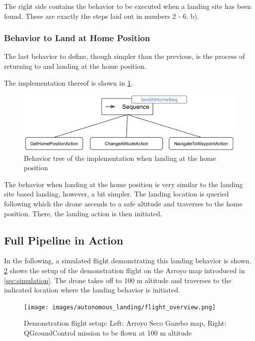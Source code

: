 The right side contains the behavior to be executed when a landing site has been found. These are exactly the steps laid out in numbers 2 - 6. b).


\subsubsection{Behavior to Land at Home Position}

The last behavior to define, though simpler than the previous, is the process of returning to and landing at the home position. 

The implementation thereof is shown in \cref{fig:bt_land_at_home}.

\begin{figure}[h]
\centering
\includegraphics[scale=0.2]{images/autonomous_landing/land_at_home_beh.png}
\caption{Behavior tree of the implementation when landing at the home position}
\label{fig:bt_land_at_home}
\end{figure}

The behavior when landing at the home position is very similar to the landing site based landing, however, a bit simpler. The landing location is queried following which the drone ascends to a safe altitude and traverses to the home position. There, the landing action is then initiated.

\subsection{Full Pipeline in Action}

In the following, a simulated flight demonstrating this landing behavior is shown. \cref{fig:demo_flight_setup} shows the setup of the demonstration flight on the Arroyo map introduced in \cref{sec:simulation}. The drone takes off to 100 m altitude and traverses to the indicated location where the landing behavior is initiated.

\begin{figure}[h]
\centering
\texttt{[image: images/autonomous\_landing/flight\_overview.png]}
\caption{Demonstration flight setup: Left: Arroyo Seco Gazebo map, Right: QGroundControl mission to be flown at 100 m altitude}
\label{fig:demo_flight_setup}
\end{figure}

